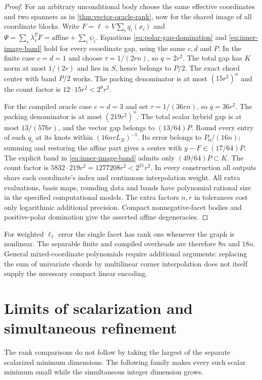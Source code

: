 \begin{proof}
For an arbitrary unconditional body choose the same effective coordinates
and two spanners as in \cref{thm:vector-oracle-rank}, now for the shared
image of all coordinate blocks. Write
$F=\ell+V\sum_iq_i(x_i)$ and
$\Psi=\sum_s\lambda_s^TF=\text{affine}+\sum_i\psi_i$.
Equations \eqref{eq:polar-gap-domination} and
\eqref{eq:inner-image-band} hold for every coordinate gap, using the
same $c,d$ and $P$. In the finite case $c=d=1$ and choose
$\tau=1/(2rn)$, so $q=2r^2$. The total gap has $K$ norm at most
$1/(2r)$ and lies in $S$, hence belongs to $P/2$.
The exact chord center with band $P/2$ works. The packing denominator
is at most $(15r^2)^n$ and the count factor is
$12\cdot15r^2<2^8r^2$.

For the compiled oracle case $c=d=3$ and set $\tau=1/(36rn)$, so
$q=36r^2$. The packing denominator is at most $(219r^2)^n$.
The total scalar hybrid gap is at most $13/(576r)$, and the vector
gap belongs to $(13/64)P$. Round every entry of each $q_i$ at its
knots within $(16nrL_B)^{-1}$. Its error belongs to $P_0/(16n)$;
summing and restoring the affine part gives a center with
$y-F\in(17/64)P$. The explicit band in
\eqref{eq:inner-image-band} admits only $(49/64)P\subset K$.
The count factor is $5832\cdot219r^2=1277208r^2<2^{21}r^2$.
In every construction all outputs share each coordinate's index and
continuous interpolation weight. All extra evaluations, basis maps,
rounding data and bands have polynomial rational size in the specified
computational models. The extra factors $n,r$ in tolerances cost only
logarithmic additional precision. Compact nonnegative-facet bodies and
positive-polar domination give the asserted affine degeneracies.
\end{proof}

For weighted $\ell_1$ error the single facet has rank one whenever the
graph is nonlinear. The separable finite and compiled overheads are
therefore $8n$ and $18n$. General mixed-coordinate polynomials require
additional arguments: replacing the sum of univariate chords by
multilinear corner interpolation does not itself supply the necessary
compact linear encoding.

\section{Limits of scalarization and simultaneous refinement}
\label{sec:vector-obstructions}

The rank comparisons do not follow by taking the largest of the separate
scalarized minimum dimensions. The following family makes every such
scalar minimum small while the simultaneous integer dimension grows.

